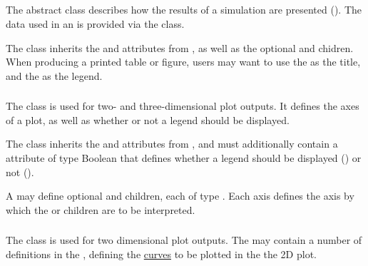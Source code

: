 \subsection{}
\label{class:output}

The abstract \Output class describes how the results of a simulation are presented ().  The data used in an \Output is provided via the \DataGenerator class.


\begin{blockChanged}
The \Output class inherits the  and  attributes from \SedBase, as well as the optional  and  chidren.  When producing a printed table or figure, users may want to use the  as the title, and the  as the legend.
\end{blockChanged}

\begin{blockChanged}
\subsubsection{}
\label{class:plot}
The \Plot class is used for two- and three-dimensional plot outputs.  It defines the axes of a plot, as well as whether or not a legend should be displayed.


The \Plot class inherits the  and  attributes from \SedBase, and must additionally contain a  attribute of type Boolean that defines whether a legend should be displayed () or not ().

A \Plot may define optional  and  children, each of type \Axis.  Each axis defines the axis by which the \Curve or \Surface children are to be interpreted.  

\end{blockChanged}

\subsubsection{}
\label{class:plot2D}
The  class is used for two dimensional plot outputs. The  may contain a number of \Curve definitions in the , defining the \hyperref[class:curve]{curves} to be plotted in the the 2D plot.  


